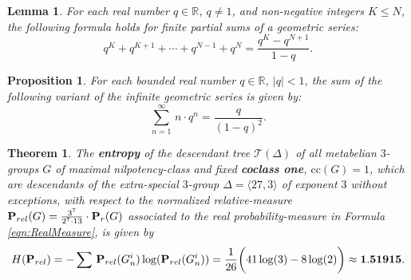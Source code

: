 \documentclass[10pt,a4paper]{amsart}
\newtheorem{theorem}{Theorem}
\newtheorem{lemma}{Lemma}
\newtheorem{proposition}{Proposition}
\begin{document}
\begin{lemma}
\label{lem:FinitePart}
For each real number \(q\in\mathbb{R}\), \(q\ne 1\),
and non-negative integers \(K\le N\), the following formula holds
for finite partial sums of a geometric series:
\begin{equation}
\label{eqn:FinitePart}
q^K+q^{K+1}+\cdots+q^{N-1}+q^N=\frac{q^K-q^{N+1}}{1-q}.
\end{equation}
\end{lemma}

\begin{proposition}
\label{prp:GeometricVariant}
For each bounded real number \(q\in\mathbb{R}\), \(\lvert q\rvert<1\),
the sum of the following variant of the infinite geometric series is given by:
\begin{equation}
\label{eqn:GeometricVariant}
\sum_{n=1}^\infty\,n\cdot q^n=\frac{q}{(1-q)^2}.
\end{equation}
\end{proposition}

\begin{theorem}
\label{thm:CoClassOne}
The \textbf{entropy} of the descendant tree
\(\mathcal{T}(\Delta)\)
of all metabelian \(3\)-groups \(G\) of maximal nilpotency-class and fixed \textbf{coclass one},
\(\mathrm{cc}(G)=1\),
which are descendants of the extra-special \(3\)-group
\(\Delta=\langle 27,3\rangle\)
of exponent \(3\) without exceptions,
with respect to the normalized relative-measure
\({\bf P}_{rel}(G)=\frac{3^7}{2^7\cdot 13}\cdot{\bf P}_{r}(G)\)
associated to the real probability-measure in Formula
\eqref{eqn:RealMeasure},
is given by
\begin{equation}
\label{eqn:Entropy1}
H({\bf P}_{rel})
=-\sum\,{\bf P}_{rel}(G_n^i)\log({\bf P}_{rel}(G_n^i))
=\frac{1}{26}\biggl(41\log(3)-8\log(2)\biggr)
\approx{\bf 1.51915}.
\end{equation}
\end{theorem}
\end{document}
